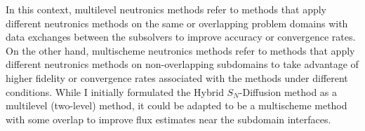 In this context, multilevel neutronics methods refer to methods that apply different neutronics
methods on the same or overlapping problem domains with data exchanges between the subsolvers to
improve accuracy or convergence rates. On the other hand, multischeme neutronics methods refer to
methods that apply different neutronics methods on non-overlapping subdomains to take advantage of
higher fidelity or convergence rates associated with the methods under different conditions. While
I initially formulated the Hybrid $S_N$-Diffusion method as a multilevel (two-level) method, it
could be adapted to be a multischeme method with some overlap to improve flux estimates near the
subdomain interfaces.
